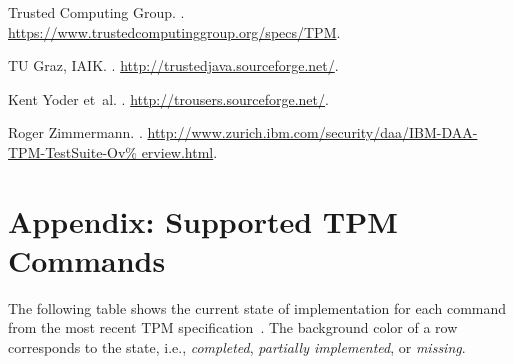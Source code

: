 \documentclass[runningheads]{llncs}
\begin{document}
\begin{thebibliography}{10}
{Trusted Computing Group}.
.
\newblock \newline\url{https://www.trustedcomputinggroup.org/specs/TPM}.

{TU Graz, IAIK}.
.
\newblock \newline\url{http://trustedjava.sourceforge.net/}.

Kent Yoder et~al.
.
\newblock \newline\url{http://trousers.sourceforge.net/}.

Roger Zimmermann.
.
\newblock
  \newline\url{http://www.zurich.ibm.com/security/daa/IBM-DAA-TPM-TestSuite-Ov%
erview.html}.

\end{thebibliography}

\appendix
\newpage

\section{Appendix: Supported TPM Commands}\label{app:commands}
\newcommand{\tpmred}{tpmgray!10!red!50!white}
\newcommand{\tpmyellow}{tpmgray!10!yellow!50!white}
\newcommand{\tpmgreen}{tpmgray!10!green!50!white}
\newcommand{\tpmcolor}{tpmgray}

\newcommand{\tpmcmd}[6]{
	\begin{tabular}{p{4.5cm}|p{0.46cm}|p{0.4cm}|p{0.25cm}|p{2.5cm}|p{2.5cm}}
		\rowcolor{\tpmcolor}
			{\scriptsize\textsf{#1}} &
			{\scriptsize\textsf{#2}} &
			{\scriptsize\makebox[0.4cm][r]{#3}} &
			{\scriptsize\makebox[0.25cm][c]{#4}} &
			{\scriptsize\texttt{#5}} &
			{\scriptsize #6}\\
	\end{tabular}
}
\newcommand{\tpmcmdr}[6]{
	\renewcommand{\tpmcolor}{\tpmred}
	\tpmcmd{#1}{#2}{#3}{#4}{#5}{#6}
	\renewcommand{\tpmcolor}{tpmgray}
}
\newcommand{\tpmcmdg}[6]{
	\renewcommand{\tpmcolor}{\tpmgreen}
	\tpmcmd{#1}{#2}{#3}{#4}{#5}{#6}
	\renewcommand{\tpmcolor}{tpmgray}
}
\newcommand{\tpmcmdy}[6]{
	\renewcommand{\tpmcolor}{\tpmyellow}
	\tpmcmd{#1}{#2}{#3}{#4}{#5}{#6}
	\renewcommand{\tpmcolor}{tpmgray}
}
The following table shows the current state of implementation for each
command from the most recent TPM specification~\cite{TPM}. The background
color of a row corresponds to the state, i.e.,
\colorbox{\tpmgreen}{\emph{completed}},
\colorbox{\tpmyellow}{\emph{partially implemented}}, or
\colorbox{\tpmred}{\emph{missing}}.
\end{document}
